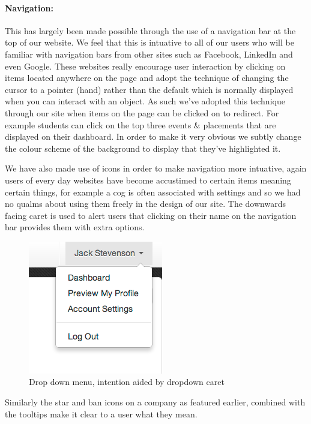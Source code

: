     \paragraph{Navigation:} This has largely been made possible through the use of a navigation bar at the top of our website. We feel that this is intuative to all of our users who will be familiar with navigation bars from other sites such as Facebook\cite{facebook}, LinkedIn\cite{linkedin} and even Google\cite{google}. These websites really encourage user interaction by clicking on items located anywhere on the page and adopt the technique of changing the cursor to a pointer (hand) rather than the default which is normally displayed when you can interact with an object. As such we've adopted this technique through our site when items on the page can be clicked on to redirect. For example students can click on the top three events \& placements that are displayed on their dashboard. In order to make it very obvious we subtly change the colour scheme of the background to display that they've highlighted it.

    We have also made use of icons in order to make navigation more intuative, again users of every day websites have become accustimed to certain items meaning certain things, for example a cog is often associated with settings and so we had no qualms about using them freely in the design of our site.
    The downwards facing caret is used to alert users that clicking on their name on the navigation bar provides them with extra options.
    
    \begin{figure}[H]\centering
    \includegraphics[scale=0.5]{images/design/navigation_caret}
    \caption{Drop down menu, intention aided by dropdown caret}
    \end{figure}

    Similarly the star and ban icons on a company as featured earlier, combined with the tooltips make it clear to a user what they mean.

